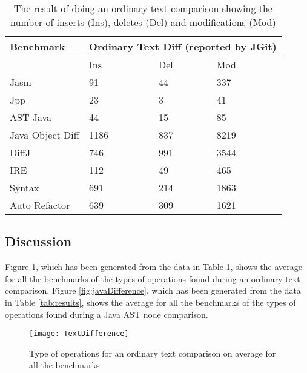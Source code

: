 \begin{table}[H]
    \centering
    \begin{tabular}{l|lll}
    Benchmark        & \multicolumn{3}{|c}{Ordinary Text Diff (reported by JGit)} \\ \hline
    ~                & Ins            & Del & Mod  \\ \hline
    Jasm             & 91             & 44  & 337  \\
    Jpp              & 23             & 3   & 41   \\
    AST Java         & 44             & 15  & 85   \\
    Java Object Diff & 1186           & 837 & 8219 \\
    DiffJ            & 746            & 991 & 3544 \\
    IRE              & 112            & 49  & 465  \\
    Syntax           & 691            & 214 & 1863 \\
    Auto Refactor    & 639            & 309 & 1621 \\
    \end{tabular}
    \caption{The result of doing an ordinary text comparison showing the number of inserts (Ins), deletes (Del) and modifications (Mod)}
    \label{tab:textcomp}
\end{table}



  
\subsection{Discussion}
Figure \ref{fig:textDifference}, which has been generated from the data in Table \ref{tab:textcomp}, shows the average for all the benchmarks of the types of operations found during an ordinary text comparison.  
Figure \ref{fig:javaDifference}, which has been generated from the data in Table \ref{tab:results}, shows the average for all the benchmarks of the types of operations found during a Java AST node comparison.

\begin{figure}[p] 
 \begin{center}
 \texttt{[image: TextDifference]}
 \end{center}
 \caption{Type of operations for an ordinary text comparison on average for all the benchmarks}
 \label{fig:textDifference}
\end{figure}

